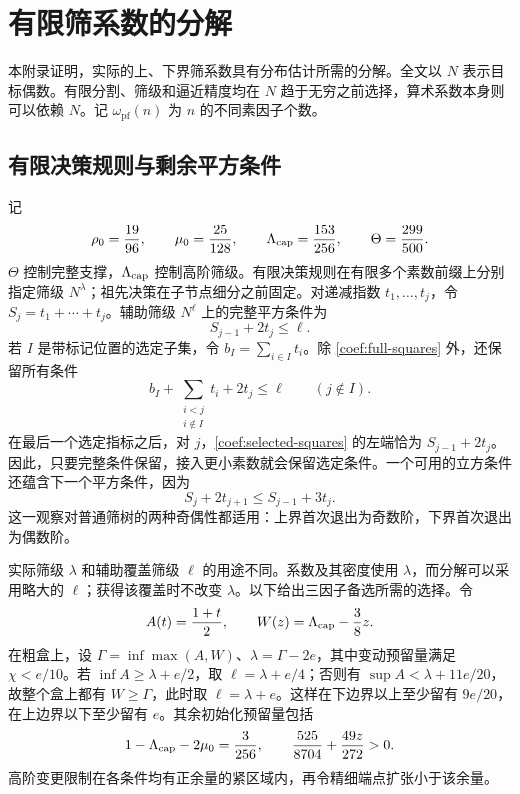 \section{有限筛系数的分解}
\label{app:coefficients}

本附录证明，实际的上、下界筛系数具有分布估计所需的分解。全文以 $N$ 表示目标偶数。有限分割、筛级和逼近精度均在 $N$ 趋于无穷之前选择，算术系数本身则可以依赖 $N$。记 $\omega_{\mathrm{pf}}(n)$ 为 $n$ 的不同素因子个数。

\subsection{有限决策规则与剩余平方条件}

记
\[
 \rho_0=\frac{19}{96},\qquad \mu_0=\frac{25}{128},\qquad
 \Lambda_{\rm cap}=\frac{153}{256},\qquad \Theta=\frac{299}{500}.
\]
$\Theta$ 控制完整支撑，$\Lambda_{\rm cap}$ 控制高阶筛级。有限决策规则在有限多个素数前缀上分别指定筛级 $N^\lambda$；祖先决策在子节点细分之前固定。对递减指数 $t_1,\ldots,t_j$，令 $S_j=t_1+\cdots+t_j$。辅助筛级 $N^\ell$ 上的完整平方条件为
\begin{equation}
 S_{j-1}+2t_j\le\ell.
 \label{coef:full-squares}
\end{equation}
若 $I$ 是带标记位置的选定子集，令 $b_I=\sum_{i\in I}t_i$。除 \eqref{coef:full-squares} 外，还保留所有条件
\begin{equation}
 b_I+\sum_{\substack{i<j\\i\notin I}}t_i+2t_j\le\ell
 \qquad(j\notin I).
 \label{coef:selected-squares}
\end{equation}
在最后一个选定指标之后，对 $j$，\eqref{coef:selected-squares} 的左端恰为 $S_{j-1}+2t_j$。因此，只要完整条件保留，接入更小素数就会保留选定条件。一个可用的立方条件还蕴含下一个平方条件，因为
\[
 S_j+2t_{j+1}\le S_{j-1}+3t_j.
\]
这一观察对普通筛树的两种奇偶性都适用：上界首次退出为奇数阶，下界首次退出为偶数阶。

实际筛级 $\lambda$ 和辅助覆盖筛级 $\ell$ 的用途不同。系数及其密度使用 $\lambda$，而分解可以采用略大的 $\ell$；获得该覆盖时不改变 $\lambda$。以下给出三因子备选所需的选择。令
\[
 A(t)=\frac{1+t}{2},\qquad W(z)=\Lambda_{\rm cap}-\frac38z.
\]
在粗盒上，设 $\Gamma=\inf\max(A,W)$、$\lambda=\Gamma-2e$，其中变动预留量满足 $\chi<e/10$。若 $\inf A\ge\lambda+e/2$，取 $\ell=\lambda+e/4$；否则有 $\sup A<\lambda+11e/20$，故整个盒上都有 $W\ge\Gamma$，此时取 $\ell=\lambda+e$。这样在下边界以上至少留有 $9e/20$，在上边界以下至少留有 $e$。其余初始化预留量包括
\[
 1-\Lambda_{\rm cap}-2\mu_0=\frac3{256},\qquad
 \frac{525}{8704}+\frac{49z}{272}>0.
\]
高阶变更限制在各条件均有正余量的紧区域内，再令精细端点扩张小于该余量。

